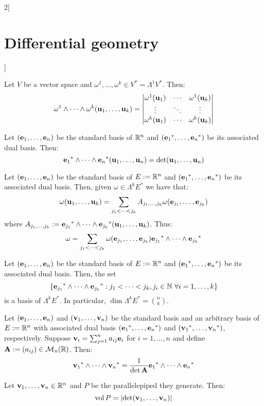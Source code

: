 \documentclass[../../../main.tex]{subfiles}
\begin{document}
\begin{multicols}{2}[\section{Differential geometry}]
\begin{proposition}
\begin{enumerate}
    \end{enumerate}
  \end{proposition}
  \begin{proposition}
    Let $V$ be a vector space and $\omega^1,\ldots,\omega^k\in V^*=\Lambda^1V^*$. Then: $$\omega^1\wedge\cdots\wedge\omega^k(\boldsymbol{\mathrm{u}}_1,\ldots,\boldsymbol{\mathrm{u}}_k)=
      \begin{vmatrix}
        \omega^1(\boldsymbol{\mathrm{u}}_1) & \cdots & \omega^1(\boldsymbol{\mathrm{u}}_k) \\
        \vdots             & \ddots & \vdots             \\
        \omega^k(\boldsymbol{\mathrm{u}}_1) & \cdots & \omega^k(\boldsymbol{\mathrm{u}}_k)
      \end{vmatrix}$$
  \end{proposition}
  \begin{corollary}
    Let $(\boldsymbol{\mathrm{e}}_1,\ldots,\boldsymbol{\mathrm{e}}_n)$ be the standard basis of $\mathbb{R}^n$ and $({\boldsymbol{\mathrm{e}}_1}^*,\ldots,{\boldsymbol{\mathrm{e}}_n}^*)$ be its associated dual basis. Then:
    $${\boldsymbol{\mathrm{e}}_1}^*\wedge\cdots\wedge{\boldsymbol{\mathrm{e}}_n}^*(\boldsymbol{\mathrm{u}}_1,\ldots,\boldsymbol{\mathrm{u}}_n)=\det(\boldsymbol{\mathrm{u}}_1,\ldots,\boldsymbol{\mathrm{u}}_n)$$
  \end{corollary}
  \begin{proposition}
    Let $(\boldsymbol{\mathrm{e}}_1,\ldots,\boldsymbol{\mathrm{e}}_n)$ be the standard basis of $E:=\mathbb{R}^n$ and $({\boldsymbol{\mathrm{e}}_1}^*,\ldots,{\boldsymbol{\mathrm{e}}_n}^*)$ be its associated dual basis. Then, given $\omega\in\Lambda^kE^*$ we have that: $$\omega(\boldsymbol{\mathrm{u}}_1,\ldots,\boldsymbol{\mathrm{u}}_k)=\sum_{j_1<\cdots<j_k}A_{j_1,\ldots,j_k}\omega(\boldsymbol{\mathrm{e}}_{j_1},\ldots,\boldsymbol{\mathrm{e}}_{j_k})$$
    where $A_{j_1,\ldots,j_k}:={\boldsymbol{\mathrm{e}}_{j_1}}^*\wedge\cdots\wedge{\boldsymbol{\mathrm{e}}_{j_k}}^*(\boldsymbol{\mathrm{u}}_1,\ldots,\boldsymbol{\mathrm{u}}_k)$. Thus: $$\omega=\sum_{j_1<\cdots<j_k}\omega(\boldsymbol{\mathrm{e}}_{j_1},\ldots,\boldsymbol{\mathrm{e}}_{j_k}){\boldsymbol{\mathrm{e}}_{j_1}}^*\wedge\cdots\wedge{\boldsymbol{\mathrm{e}}_{j_k}}^*$$
  \end{proposition}
  \begin{corollary}
    Let $(\boldsymbol{\mathrm{e}}_1,\ldots,\boldsymbol{\mathrm{e}}_n)$ be the standard basis of $E:=\mathbb{R}^n$ and $({\boldsymbol{\mathrm{e}}_1}^*,\ldots,{\boldsymbol{\mathrm{e}}_n}^*)$ be its associated dual basis. Then, the set $$\{{\vf{e}_{j_1}}^*\wedge\cdots\wedge{\vf{e}_{j_k}}^*:j_1<\cdots<j_k,j_i\in\NN\ \forall i=1,\ldots,k\}$$
    is a basis of $\Lambda^kE^*$. In particular, $\dim \Lambda^kE^*=\binom{n}{k}$.
  \end{corollary}
  \begin{corollary}
    Let $(\boldsymbol{\mathrm{e}}_1,\ldots,\boldsymbol{\mathrm{e}}_n)$ and $(\boldsymbol{\mathrm{v}}_1,\ldots,\boldsymbol{\mathrm{v}}_n)$ be the standard basis and an arbitrary basis of $E:=\mathbb{R}^n$ with associated dual basis $({\boldsymbol{\mathrm{e}}_1}^*,\ldots,{\boldsymbol{\mathrm{e}}_n}^*)$ and $({\boldsymbol{\mathrm{v}}_1}^*,\ldots,{\boldsymbol{\mathrm{v}}_n}^*)$, respectively. Suppose $\boldsymbol{\mathrm{v}}_i=\sum_{j=1}^na_{ij}\boldsymbol{\mathrm{e}}_i$ for $i=1,\ldots,n$ and define $\boldsymbol{\mathrm{A}}:=(a_{ij})\in\mathcal{M}_n(\mathbb{R})$. Then: $${\boldsymbol{\mathrm{v}}_1}^*\wedge\cdots\wedge{\boldsymbol{\mathrm{v}}_n}^*=\frac{1}{\det\boldsymbol{\mathrm{A}}}{\boldsymbol{\mathrm{e}}_1}^*\wedge\cdots\wedge{\boldsymbol{\mathrm{e}}_n}^*$$
  \end{corollary}
  \begin{proposition}
    Let $\boldsymbol{\mathrm{v}}_1,\ldots,\boldsymbol{\mathrm{v}}_n\in\mathbb{R}^n$ and $P$ be the parallelepiped they generate. Then:
    $$\operatorname{vol} P=\abs{\det(\boldsymbol{\mathrm{v}}_1,\ldots,\boldsymbol{\mathrm{v}}_n)}$$
  \end{proposition}

\end{multicols}
\end{document}
